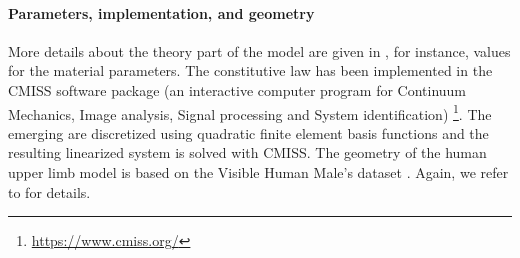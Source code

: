 \paragraph{Parameters, implementation, and geometry}

More details about the theory part of the model are given in
,
for instance, values for the material parameters.
%
The constitutive law has been implemented in the CMISS software package
(an interactive computer program for Continuum Mechanics,
Image analysis, Signal processing and System identification)%
\footnote{%
  \url{https://www.cmiss.org/}%
}.
The emerging \pdes are discretized using quadratic finite element basis
functions and the resulting linearized system is solved with CMISS.
%
The geometry of the human upper limb model is based on
the Visible Human Male's dataset \cite{Spitzer96Visible}.
Again, we refer to  for details.
